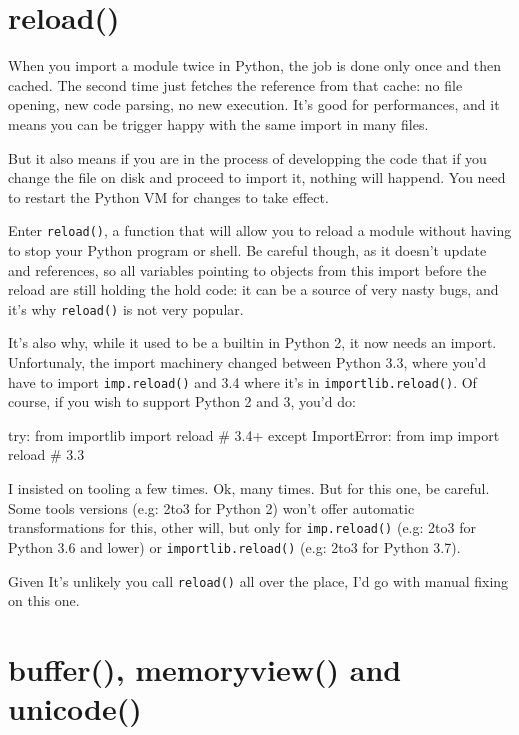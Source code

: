 \section{reload()}

When you import a module twice in Python, the job is done only once and then cached. The second time just fetches the reference from that cache: no file opening, new code parsing, no new execution. It's good for performances, and it means you can be trigger happy with the same import in many files.

But it also means if you are in the process of developping the code that if you change the file on disk and proceed to import it, nothing will happend. You need to restart the Python VM for changes to take effect.

Enter \lstinline{reload()}, a function that will allow you to reload a module without having to stop your Python program or shell. Be careful though, as it doesn't update and references, so all variables pointing to objects from this import before the reload are still holding the hold code: it can be a source of very nasty bugs, and it's why \lstinline{reload()} is not very popular.

It's also why, while it used to be a builtin in Python 2, it now needs an import. Unfortunaly, the import machinery changed between Python 3.3, where you'd have to import \lstinline{imp.reload()} and 3.4 where it's in \lstinline{importlib.reload()}. Of course, if you wish to support Python 2 and 3, you'd do:

\begin{py2and3}
try:
    from importlib import reload # 3.4+
except ImportError:
    from imp import reload # 3.3
\end{py2and3}

I insisted on tooling a few times. Ok, many times. But for this one, be careful. Some tools versions (e.g: 2to3 for Python 2) won't offer automatic transformations for this, other will, but only for \lstinline{imp.reload()} (e.g: 2to3 for Python 3.6 and lower) or \lstinline{importlib.reload()} (e.g: 2to3 for Python 3.7).

Given It's unlikely you call \lstinline{reload()} all over the place, I'd go with manual fixing on this one.

\section{buffer(), memoryview() and unicode()}

